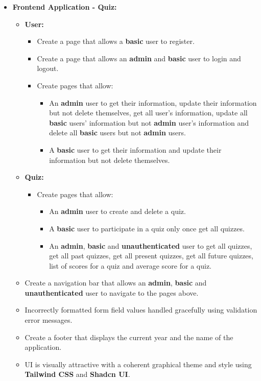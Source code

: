 \documentclass{article}
\begin{document}
\begin{itemize}
	\item \textbf{Frontend Application - Quiz:}
	\begin{itemize}
		\item \textbf{User:}
		\begin{itemize}
			\item Create a page that allows a \textbf{basic} user to register.
			\item Create a page that allows an \textbf{admin} and \textbf{basic} user to login and logout.
			\item Create pages that allow:
			\begin{itemize}
				\item An \textbf{admin} user to get their information, update their information but not delete themselves, get all user's information, update all \textbf{basic} users' information but not \textbf{admin} user's information and delete all \textbf{basic} users but not \textbf{admin} users.
				\item A \textbf{basic} user to get their information and update their information but not delete themselves.
			\end{itemize}
		\end{itemize}
		\item \textbf{Quiz:} 
		\begin{itemize}
			\item Create pages that allow:
			\begin{itemize}
				\item An \textbf{admin} user to create and delete a quiz.
				\item A \textbf{basic} user to participate in a quiz only once get all quizzes.
				\item An \textbf{admin}, \textbf{basic} and \textbf{unauthenticated} user to get all quizzes, get all past quizzes, get all present quizzes, get all future quizzes, list of scores for a quiz and average score for a quiz.
			\end{itemize}
		\end{itemize}
		\item Create a navigation bar that allows an \textbf{admin}, \textbf{basic} and \textbf{unauthenticated} user to navigate to the pages above.
		\item Incorrectly formatted form field values handled gracefully using validation error messages.
		\item Create a footer that displays the current year and the name of the application.
		\item UI is visually attractive with a coherent graphical theme and style using \textbf{Tailwind CSS} and \textbf{Shadcn UI}.
	\end{itemize}


\end{itemize}
\end{document}
